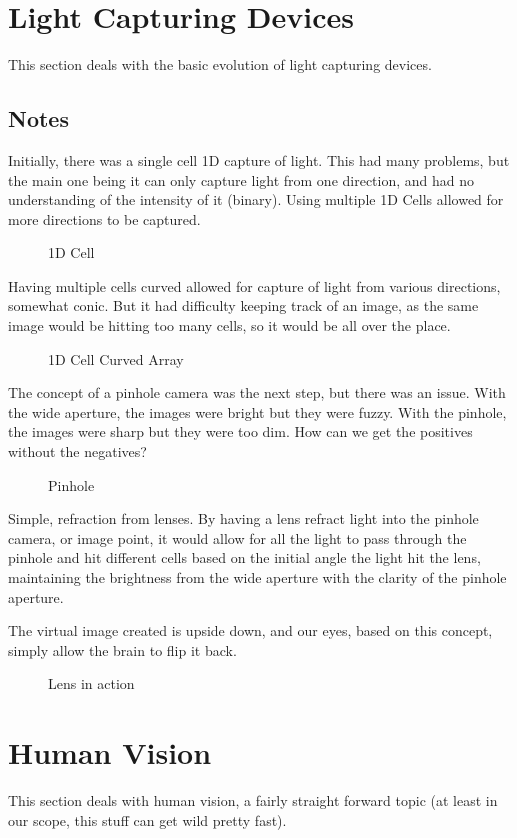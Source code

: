 \section{Light Capturing Devices}
This section deals with the basic evolution of light capturing devices.
\subsection{Notes}
Initially, there was a single cell 1D capture of light. This had many problems, but the main one being it can only capture light from one direction, and had no understanding of the intensity of it (binary). Using multiple 1D Cells allowed for more directions to be captured.
\begin{figure}[!htb]
	\caption{\label{fig:1dcell} 1D Cell}
\end{figure}
Having multiple cells curved allowed for capture of light from various directions, somewhat conic. But it had difficulty keeping track of an image, as the same image would be hitting too many cells, so it would be all over the place.
\begin{figure}[!htb]
	\caption{\label{fig:1dlinearcell} 1D Cell Curved Array}
\end{figure}
The concept of a pinhole camera was the next step, but there was an issue. With the wide aperture, the images were bright but they were fuzzy. With the pinhole, the images were sharp but they were too dim. How can we get the positives without the negatives?
\begin{figure}[!htb]
	\caption{\label{fig:pinholeaperture} Pinhole}
\end{figure}
Simple, refraction from lenses. By having a lens refract light into the pinhole camera, or image point, it would allow for all the light to pass through the pinhole and hit different cells based on the initial angle the light hit the lens, maintaining the brightness from the wide aperture with the clarity of the pinhole aperture.

The virtual image created is upside down, and our eyes, based on this concept, simply allow the brain to flip it back.
\begin{figure}[!htb]
	\caption{\label{fig:lens} Lens in action}
\end{figure}
\section{Human Vision}
This section deals with human vision, a fairly straight forward topic (at least in our scope, this stuff can get wild pretty fast).
